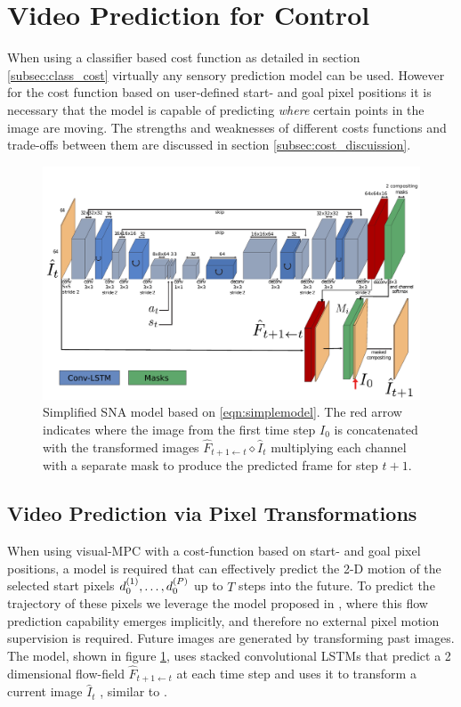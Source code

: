 \section{Video Prediction for Control}
When using a classifier based cost function as detailed in section \ref{subsec:class_cost} virtually any sensory prediction model can be used. However for the cost function based on user-defined start- and goal pixel positions it is necessary that the model is capable of predicting \emph{where} certain points in the image are moving. The strengths and weaknesses of different costs functions and trade-offs between them are discussed in section \ref{subsec:cost_discuission}.

\begin{figure}[t]
    \centering
    \includegraphics[width=\columnwidth]{images_sna/occlusionaware/architecture.pdf}
    \caption{\small{Simplified SNA model based on \autoref{eqn:simplemodel}. The red arrow indicates where the image from the first time step $I_0$ is concatenated with the transformed images $\hat{F}_{t+1 \leftarrow t} \diamond  \hat{I}_t $ multiplying each channel with a separate mask to produce the predicted frame for step $t+1$.}}      \label{fig:occlusion_model}
\end{figure}


\subsection{Video Prediction via Pixel Transformations}
\label{sec:model}
When using visual-MPC with a cost-function based on start- and goal pixel positions, a model is required that can effectively predict the 2-D motion of the selected start pixels $d_0^{(1)}, \dots, d_0^{(P)}$ up to $T$ steps into the future.
To predict the trajectory of these pixels we leverage the model proposed in \cite{finn_nips}, where this flow prediction capability emerges implicitly, and therefore no external pixel motion supervision is required. Future images are generated by transforming past images. The model, shown in figure \ref{fig:occlusion_model}, uses stacked convolutional LSTMs that predict a 2 dimensional flow-field $\hat{F}_{t+1 \leftarrow t}$ at each time step and uses it to transform a current image $\hat{I}_t$ , similar to \cite{zhou2016view}.

